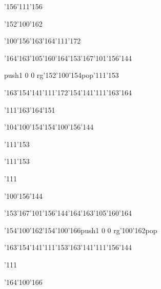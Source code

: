 \null\vfill\ipa\centerline{\enskip\enskip\enskip\enskip\char'156\char'111\char'156\enskip\enskip\enskip\enskip\enskip\enskip}\medskip\centerline{\enskip\enskip\enskip\char'152\char'100\char'162\enskip\enskip\enskip\enskip\enskip\enskip\enskip\enskip}\medskip\centerline{\enskip\enskip\enskip\enskip\enskip\enskip\enskip\enskip\enskip\enskip\enskip\enskip}\medskip\centerline{\enskip\enskip\enskip\enskip\char'100\char'156\char'163\enskip\enskip\enskip\enskip\char'164\char'111\char'172}\medskip\centerline{\enskip\enskip\enskip\enskip\enskip\char'164\char'163\char'105\char'160\char'164\enskip\char'153\char'167\char'101\char'156\char'144\enskip\enskip\enskip}\medskip\centerline{\enskip\enskip\enskip\enskip\enskip\enskip\enskip\enskip\enskip\enskip\enskip\pdfcolorstack\match push{1 0 0 rg}\char'152\char'100\char'154\pdfcolorstack\match pop{}\enskip\char'111\char'153}\medskip\centerline{\enskip\char'163\char'154\char'141\char'111\char'172\enskip\enskip\enskip\enskip\char'154\char'141\char'111\char'163\char'164\enskip\enskip\enskip}\medskip\centerline{\enskip\char'111\enskip\char'163\char'164\char'151\enskip\enskip\enskip\enskip\enskip\enskip}\medskip\centerline{\enskip\enskip\enskip\enskip\enskip\enskip\enskip\char'104\char'100\char'154\enskip\char'154\char'100\char'156\char'144}\medskip\vfill\footline{\hfil\tt\folio\hfil}\eject
\null\vfill\ipa\centerline{\enskip\char'111\char'153\enskip\enskip\enskip\enskip\enskip\enskip\enskip\enskip\enskip\enskip}\medskip\centerline{\enskip\enskip\enskip\enskip\enskip\enskip\enskip\enskip\enskip\enskip\enskip\enskip\char'111\char'153}\medskip\centerline{\enskip\char'111\enskip\enskip\enskip\enskip\enskip\enskip\enskip\enskip\enskip\enskip}\medskip\centerline{\enskip\enskip\enskip\enskip\char'100\char'156\char'144\enskip\enskip\enskip\enskip\enskip\enskip\enskip}\medskip\centerline{\enskip\enskip\enskip\enskip\enskip\char'153\char'167\char'101\char'156\char'144\enskip\char'164\char'163\char'105\char'160\char'164\enskip\enskip\enskip}\medskip\centerline{\enskip\enskip\enskip\char'154\char'100\char'162\enskip\char'154\char'100\char'166\enskip\enskip\enskip\enskip\enskip\pdfcolorstack\match push{1 0 0 rg}\char'100\char'162\pdfcolorstack\match pop{}}\medskip\centerline{\enskip\char'163\char'154\char'141\char'111\char'153\enskip\enskip\enskip\enskip\char'163\char'141\char'111\char'156\char'144\enskip\enskip\enskip}\medskip\centerline{\enskip\char'111\enskip\enskip\enskip\enskip\enskip\enskip\enskip\enskip\enskip\enskip}\medskip\centerline{\enskip\enskip\enskip\enskip\enskip\enskip\enskip\char'164\char'100\char'166\enskip\enskip\enskip\enskip\enskip}\medskip\vfill\footline{\hfil\tt\folio\hfil}\eject
